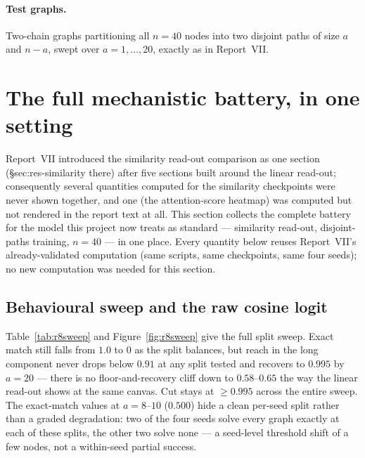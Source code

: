 \documentclass[11pt,a4paper]{article}
\begin{document}
\paragraph{Test graphs.} Two-chain graphs partitioning all $n=40$ nodes into
two disjoint paths of size $a$ and $n-a$, swept over $a=1,\dots,20$, exactly
as in Report~VII.

\section{The full mechanistic battery, in one setting}
\label{sec:battery}

Report~VII introduced the similarity read-out comparison as one section
(\S sec:res-similarity there) after five sections built around the linear
read-out; consequently several quantities computed for the similarity
checkpoints were never shown together, and one (the attention-score heatmap)
was computed but not rendered in the report text at all. This section
collects the complete battery for the model this project now treats as
standard --- similarity read-out, disjoint-paths training, $n=40$ --- in one
place. Every quantity below reuses Report~VII's already-validated
computation (same scripts, same checkpoints, same four seeds); no new
computation was needed for this section.

\subsection{Behavioural sweep and the raw cosine logit}
\label{sec:battery-sweep}

Table~\ref{tab:r8sweep} and Figure~\ref{fig:r8sweep} give the full split
sweep. Exact match still falls from $1.0$ to $0$ as the split balances, but
reach in the long component never drops below $0.91$ at any split tested and
recovers to $0.995$ by $a=20$ --- there is no floor-and-recovery cliff down to
$0.58$--$0.65$ the way the linear read-out shows at the same canvas. Cut
stays at $\ge0.995$ across the entire sweep. The exact-match values at
$a=8$--$10$ ($0.500$) hide a clean per-seed split rather than a graded
degradation: two of the four seeds solve every graph exactly at each of these
splits, the other two solve none --- a seed-level threshold shift of a few
nodes, not a within-seed partial success.
\end{document}
